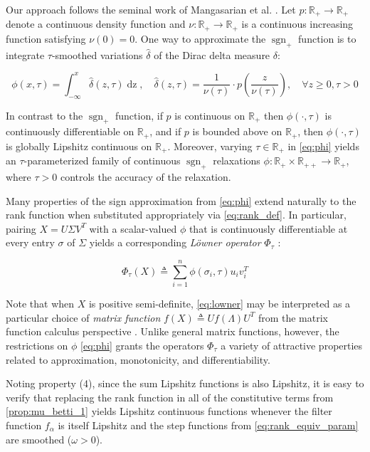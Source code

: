 \documentclass[pdflatex,sn-mathphys-num]{sn-jnl}
\begin{document}
Our approach follows the seminal work of Mangasarian et al. \cite{mangasarian1994class}. Let \(p:\mathbb{R}_{+} \rightarrow \mathbb{R}_{+}\) denote a continuous density function and \(\nu:\mathbb{R}_{+} \rightarrow \mathbb{R}_{+}\) is a continuous increasing function satisfying \(\nu(0) = 0\). One way to approximate the \(\operatorname{sgn}_{+}\) function is to integrate \(\tau\)-smoothed variations \(\hat{\delta}\) of the Dirac delta measure \(\delta\):

\[\phi(x,\tau) = \int_{- \infty}^{x}\hat{\delta}(z,\tau)\operatorname{dz},\quad\hat{\delta}(z,\tau) = \frac{1}{\nu(\tau)} \cdot p\left( \frac{z}{\nu(\tau)} \right),\quad\forall z \geq 0,\tau > 0\] \protect{}\label{eq:phi}{}

In contrast to the \(\operatorname{sgn}_{+}\) function, if \(p\) is continuous on \(\mathbb{R}_{+}\) then \(\phi ( \cdot ,\tau) \) is continuously differentiable on \(\mathbb{R}_{+}\), and if \(p\) is bounded above on \(\mathbb{R}_{+}\), then \(\phi ( \cdot ,\tau) \) is globally Lipshitz continuous on \(\mathbb{R}_{+}\). Moreover, varying \(\tau \in \mathbb{R}_{+}\) in \ref{eq:phi} yields an \(\tau\)-parameterized family of continuous \(\operatorname{sgn}_{+}\) relaxations \(\phi:\mathbb{R}_{+} \times \mathbb{R}_{+ +} \rightarrow \mathbb{R}_{+}\), where \(\tau > 0\) controls the accuracy of the relaxation.

Many properties of the sign approximation from \ref{eq:phi} extend naturally to the rank function when substituted appropriately via \ref{eq:rank_def}. In particular, pairing \(X = U\Sigma V^{T}\) with a scalar-valued \(\phi\) that is continuously differentiable at every entry \(\sigma\) of \(\Sigma\) yields a corresponding \emph{Löwner operator} \(\Phi_{\tau}\) \cite{bi2013approximation}:

\[\Phi_{\tau}(X) \triangleq \sum_{i = 1}^{n}\phi\left( \sigma_{i},\tau \right)u_{i}v_{i}^{T}\] \protect{}\label{eq:lowner}{}

Note that when \(X\) is positive semi-definite, \ref{eq:lowner} may be interpreted as a particular choice of \emph{matrix function} \(f(X) \triangleq Uf(\Lambda)U^{T}\) from the matrix function calculus perspective \cite{bhatia2013matrix}. Unlike general matrix functions, however, the restrictions on \(\phi\) \ref{eq:phi} grants the operators \(\Phi_{\tau}\) a variety of attractive properties related to approximation, monotonicity, and differentiability.

Noting property (4), since the sum Lipshitz functions is also Lipshitz, it is easy to verify that replacing the rank function in all of the constitutive terms from \ref{prop:mu_betti_1} yields Lipshitz continuous functions whenever the filter function \(f_{\alpha}\) is itself Lipshitz and the step functions from \ref{eq:rank_equiv_param} are smoothed (\(\omega > 0\)).
\end{document}
